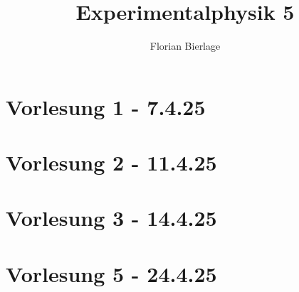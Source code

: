 \documentclass[]{scrbook}
\title{Experimentalphysik 5}
\author{Florian Bierlage}
\begin{document}
\maketitle
\newpage
\tableofcontents
\newpage

\section*{Vorlesung 1 - 7.4.25} 


\section*{Vorlesung 2 - 11.4.25}


\section*{Vorlesung 3 - 14.4.25}


\section*{Vorlesung 5 - 24.4.25}

\end{document}
